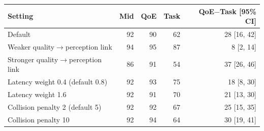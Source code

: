 \begin{tabular}{lrrrr}
\hline
Setting & Mid & QoE & Task & QoE$-$Task [95\% CI] \\
\hline
Default & 92 & 90 & 62 & 28 [16, 42] \\
Weaker quality$\to$perception link & 94 & 95 & 87 & 8 [2, 14] \\
Stronger quality$\to$perception link & 86 & 91 & 54 & 37 [26, 46] \\
Latency weight 0.4 (default 0.8) & 92 & 93 & 75 & 18 [8, 30] \\
Latency weight 1.6 & 92 & 91 & 70 & 21 [13, 30] \\
Collision penalty 2 (default 5) & 92 & 92 & 67 & 25 [15, 35] \\
Collision penalty 10 & 92 & 94 & 64 & 30 [19, 41] \\
\hline
\end{tabular}
